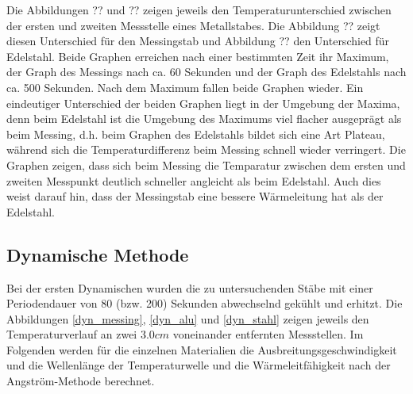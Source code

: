 \documentclass[11pt]{article}
\begin{document}
Die Abbildungen ?? und ?? zeigen jeweils den Temperaturunterschied zwischen der ersten und zweiten Messstelle eines Metallstabes. Die Abbildung ?? zeigt diesen Unterschied für den Messingstab und Abbildung ?? den Unterschied für Edelstahl.
Beide Graphen erreichen nach einer bestimmten Zeit ihr Maximum, der Graph des Messings nach ca. 60 Sekunden und der Graph des Edelstahls nach ca. 500 Sekunden. Nach dem Maximum fallen beide Graphen wieder. Ein eindeutiger Unterschied der beiden Graphen liegt in der Umgebung der Maxima, denn beim Edelstahl ist die Umgebung des Maximums viel flacher ausgeprägt als beim Messing, d.h. beim Graphen des Edelstahls bildet sich eine Art Plateau, während sich die Temperaturdifferenz beim Messing schnell wieder verringert. Die Graphen zeigen, dass sich beim Messing die Temparatur zwischen dem ersten und zweiten Messpunkt deutlich schneller angleicht als beim Edelstahl. Auch dies weist darauf hin, dass der Messingstab eine bessere Wärmeleitung hat als der Edelstahl.

\subsection{Dynamische Methode}
Bei der ersten Dynamischen wurden die zu untersuchenden St\"abe mit einer Periodendauer von 80 (bzw. 200)  Sekunden abwechselnd gek\"uhlt und erhitzt. Die Abbildungen \ref{dyn_messing}, \ref{dyn_alu} und \ref{dyn_stahl} zeigen jeweils den Temperaturverlauf an zwei 3.0$cm$ voneinander entfernten Messstellen. Im Folgenden werden f\"ur die einzelnen Materialien die Ausbreitungsgeschwindigkeit und die Wellenl\"ange der Temperaturwelle und die W\"armeleitf\"ahigkeit nach der Angstr\"om-Methode berechnet.
\end{document}
